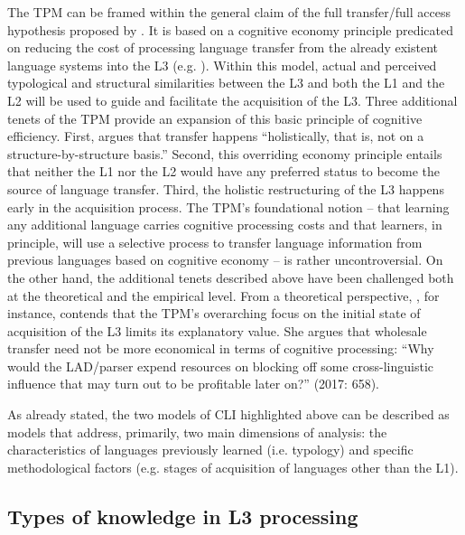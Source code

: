 \documentclass[output=paper,modfonts,nonflat,newtxmath]{langsci/langscibook}
\begin{document}
The TPM can be framed within the general claim of the full transfer/full access hypothesis proposed by \citet{SchwartzSprouse1996}. It is based on a cognitive economy principle predicated on reducing the cost of processing language transfer from the already existent language systems into the L3 (e.g. \citealt{Rothman2011, Rothman2015}). Within this model, actual and perceived typological and structural similarities between the L3 and both the L1 and the L2 will be used to guide and facilitate the acquisition of the L3. Three additional tenets of the TPM provide an expansion of this basic principle of cognitive efficiency. First, \citet[180]{Rothman2015} argues that transfer happens “holistically, that is, not on a structure-by-structure basis.” Second, this overriding economy principle entails that neither the L1 nor the L2 would have any preferred status to become the source of language transfer. Third, the holistic restructuring of the L3 happens early in the acquisition process. The TPM’s foundational notion – that learning any additional language carries cognitive processing costs and that learners, in principle, will use a selective process to transfer language information from previous languages based on cognitive economy – is rather uncontroversial. On the other hand, the additional tenets described above have been challenged both at the theoretical and the empirical level. From a theoretical perspective, \citet{Slabakova2017}, for instance, contends that the TPM’s overarching focus on the initial state of acquisition of the L3 limits its explanatory value. She argues that wholesale transfer need not be more economical in terms of cognitive processing: “Why would the LAD/parser expend resources on blocking off some cross-linguistic influence that may turn out to be profitable later on?” (2017: 658).

As already stated, the two models of CLI highlighted above can be described as models that address, primarily, two main dimensions of analysis: the characteristics of languages previously learned (i.e. typology) and specific methodological factors (e.g. stages of acquisition of languages other than the L1).

\subsection{{Types} {of} {knowledge} {in} {L3} {processing}}%
\label{sec:salaberry:2.2}
\end{document}
